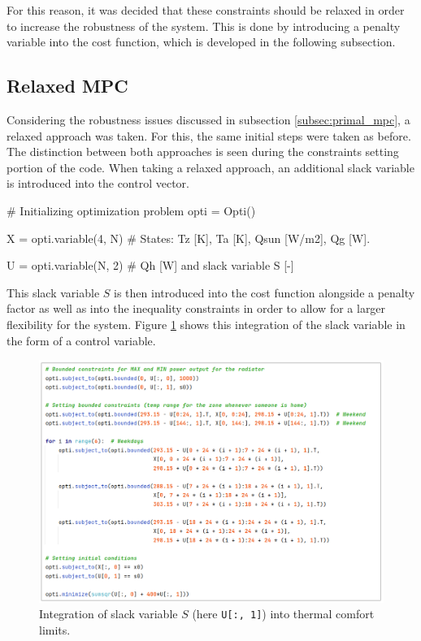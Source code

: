 For this reason, it was decided that these constraints should be relaxed in order to increase the robustness of the system. This is done by introducing a penalty variable into the cost function, which is developed in the following subsection.

\newpage
\subsection{Relaxed MPC}
\label{subsec:relaxed_mpc}
Considering the robustness issues discussed in subsection \ref{subsec:primal_mpc}, a relaxed approach was taken. For this, the same initial steps were taken as before. The distinction between both approaches is seen during the constraints setting portion of the code. When taking a relaxed approach, an additional slack variable is introduced into the control vector. 

\begin{python}
# Initializing optimization problem
opti = Opti()

X = opti.variable(4, N)  # States: Tz [K], Ta [K], Qsun [W/m2], Qg [W].

U = opti.variable(N, 2)  # Qh [W] and slack variable S [-]
\end{python}

This slack variable $S$ is then introduced into the cost function alongside a penalty factor as well as into the inequality constraints in order to allow for a larger flexibility for the system. Figure \ref{fig:relaxed_mpc_st} shows this integration of the slack variable in the form of a control variable.

\begin{figure}[H]
\centering
\includegraphics[width=\textwidth]{images/relaxed_mpc_st2.png}
\caption{Integration of slack variable $S$ (here \texttt{U[:, 1]}) into thermal comfort limits.}
\label{fig:relaxed_mpc_st}
\end{figure}

